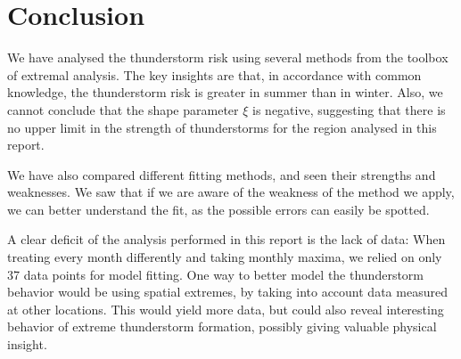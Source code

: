 \documentclass[10pt,conference,compsocconf]{IEEEtran}
\begin{document}
\section*{Conclusion}
We have analysed the thunderstorm risk using several methods from the toolbox of extremal analysis. The key insights are that, in accordance with common knowledge, the thunderstorm risk is greater in summer than in winter. Also, we cannot conclude that the shape parameter $\xi$ is negative, suggesting that there is no upper limit in the strength of thunderstorms for the region analysed in this report.
\par
We have also compared different fitting methods, and seen their strengths and weaknesses. We saw that if we are aware of the weakness of the method we apply, we can better understand the fit, as the possible errors can easily be spotted. 
\par
A clear deficit of the analysis performed in this report is the lack of data: When treating every month differently and taking monthly maxima, we relied on only 37 data points for model fitting. One way to better model the thunderstorm behavior would be using spatial extremes, by taking into account data measured at other locations. This would yield more data, but could also reveal interesting behavior of extreme thunderstorm formation, possibly giving valuable physical insight. 


%
%


\end{document}
